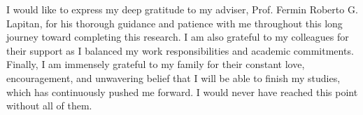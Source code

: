 
I would like to express my deep gratitude to my adviser, Prof. Fermin Roberto G.
Lapitan, for his thorough guidance and patience with me throughout this long
journey toward completing this research. I am also grateful to my colleagues for
their support as I balanced my work responsibilities and academic commitments.
Finally, I am immensely grateful to my family for their constant love,
encouragement, and unwavering belief that I will be able to finish my studies,
which has continuously pushed me forward. I would never have reached this point
without all of them.
